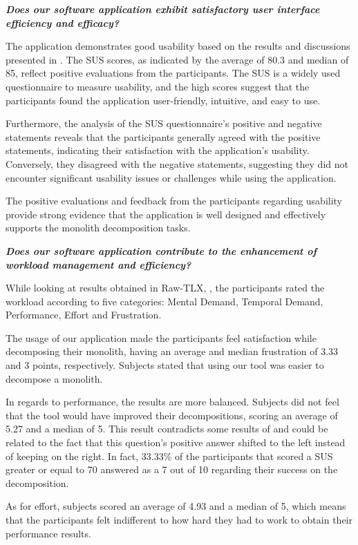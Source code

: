 \textbf{\emph{Does our software application exhibit satisfactory user interface
efficiency and efficacy?}}

The application demonstrates good usability based on the results and
discussions presented in . The SUS scores, as indicated by the
average of 80.3 and median of 85, reflect positive evaluations from the
participants. The SUS is a widely used questionnaire to measure usability, and
the high scores suggest that the participants found the application
user-friendly, intuitive, and easy to use.

Furthermore, the analysis of the SUS questionnaire's positive and negative
statements reveals that the participants generally agreed with the positive
statements, indicating their satisfaction with the application's usability.
Conversely, they disagreed with the negative statements, suggesting they did
not encounter significant usability issues or challenges while using the
application.

The positive evaluations and feedback from the participants regarding usability
provide strong evidence that the application is well designed and effectively
supports the monolith decomposition tasks.

\textbf{\emph{Does our software application contribute to the enhancement of
workload management and efficiency?}}

While looking at results obtained in Raw-TLX, , the
participants rated the workload according to five categories: Mental Demand,
Temporal Demand, Performance, Effort and Frustration.

The usage of our application made the participants feel satisfaction while
decomposing their monolith, having an average and median frustration of 3.33
and 3 points, respectively. Subjects stated that using our tool was easier to
decompose a monolith.

In regards to performance, the results are more balanced. Subjects did not feel
that the tool would have improved their decompositions, scoring an average of
5.27 and a median of 5. This result contradicts some results of 
and could be related to the fact that this question's positive answer shifted
to the left instead of keeping on the right. In fact, 33.33\% of the
participants that scored a SUS greater or equal to 70 answered as a 7 out of 10
regarding their success on the decomposition.

As for effort, subjects scored an average of 4.93 and a median of 5, which
means that the participants felt indifferent to how hard they had to work to
obtain their performance results.

